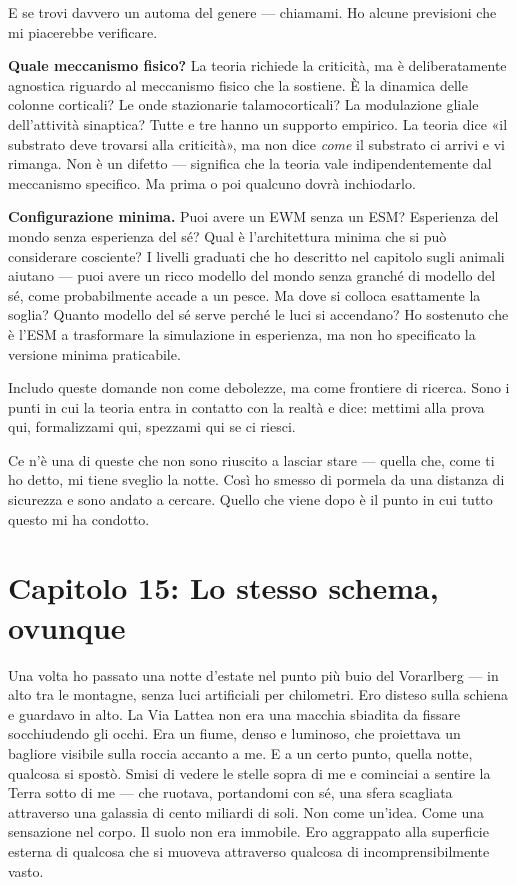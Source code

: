 \documentclass[11pt, twoside, openright]{book}
\begin{document}
E se trovi davvero un automa del genere --- chiamami. Ho alcune previsioni che mi piacerebbe verificare.

\textbf{Quale meccanismo fisico?} La teoria richiede la criticità, ma è deliberatamente agnostica riguardo al meccanismo fisico che la sostiene. È la dinamica delle colonne corticali? Le onde stazionarie talamocorticali? La modulazione gliale dell'attività sinaptica? Tutte e tre hanno un supporto empirico. La teoria dice «il substrato deve trovarsi alla criticità», ma non dice \textit{come} il substrato ci arrivi e vi rimanga. Non è un difetto --- significa che la teoria vale indipendentemente dal meccanismo specifico. Ma prima o poi qualcuno dovrà inchiodarlo.

\textbf{Configurazione minima.} Puoi avere un EWM senza un ESM? Esperienza del mondo senza esperienza del sé? Qual è l'architettura minima che si può considerare cosciente? I livelli graduati che ho descritto nel capitolo sugli animali aiutano --- puoi avere un ricco modello del mondo senza granché di modello del sé, come probabilmente accade a un pesce. Ma dove si colloca esattamente la soglia? Quanto modello del sé serve perché le luci si accendano? Ho sostenuto che è l'ESM a trasformare la simulazione in esperienza, ma non ho specificato la versione minima praticabile.

Includo queste domande non come debolezze, ma come frontiere di ricerca. Sono i punti in cui la teoria entra in contatto con la realtà e dice: mettimi alla prova qui, formalizzami qui, spezzami qui se ci riesci.

Ce n'è una di queste che non sono riuscito a lasciar stare --- quella che, come ti ho detto, mi tiene sveglio la notte. Così ho smesso di pormela da una distanza di sicurezza e sono andato a cercare. Quello che viene dopo è il punto in cui tutto questo mi ha condotto.


\chapter*{Capitolo 15: Lo stesso schema, ovunque}

Una volta ho passato una notte d'estate nel punto più buio del Vorarlberg --- in alto tra le montagne, senza luci artificiali per chilometri. Ero disteso sulla schiena e guardavo in alto. La Via Lattea non era una macchia sbiadita da fissare socchiudendo gli occhi. Era un fiume, denso e luminoso, che proiettava un bagliore visibile sulla roccia accanto a me. E a un certo punto, quella notte, qualcosa si spostò. Smisi di vedere le stelle sopra di me e cominciai a sentire la Terra sotto di me --- che ruotava, portandomi con sé, una sfera scagliata attraverso una galassia di cento miliardi di soli. Non come un'idea. Come una sensazione nel corpo. Il suolo non era immobile. Ero aggrappato alla superficie esterna di qualcosa che si muoveva attraverso qualcosa di incomprensibilmente vasto.
\end{document}
